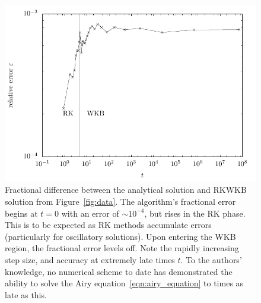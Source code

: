 \begin{figure}[tp]
  \centering
  \includegraphics[width=\textwidth]{chapters/RKWKB/figures/error}
  \caption{Fractional difference between the analytical solution and RKWKB solution from Figure~\protect\ref{fig:data}. The algorithm's fractional error begins at \(t=0\) with an error of \(\sim10^{-4}\), but rises in the RK phase. This is to be expected as RK methods accumulate errors (particularly for oscillatory solutions). Upon entering the WKB region, the fractional error levels off. Note the rapidly increasing step size, and accuracy at extremely late times \(t\). To the authors' knowledge, no numerical scheme to date has demonstrated the ability to solve the Airy equation~\protect\eqref{eqn:airy_equation} to times as late as this.}\label{fig:error}
\end{figure}




